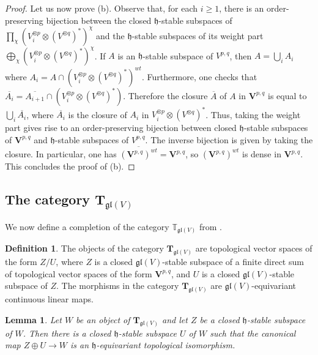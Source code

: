 \documentclass[12pt,reqno]{amsart}
\newtheorem{lem}[thm]{Lemma}
\theoremstyle{definition}
\newtheorem{defn}[thm]{Definition}
\theoremstyle{remark}
\begin{document}
\begin{proof}
	Let us now prove (b). Observe that, for each $i\geq 1$, there is an order-preserving bijection between the closed $\mathfrak{h}$-stable subspaces of $\prod_\chi (V_i ^{\otimes p}\otimes (V^{\otimes q})^*)^\chi$ and the $\mathfrak{h}$-stable subspaces of its weight part $\bigoplus_\chi (V_i ^{\otimes p}\otimes (V^{\otimes q})^*)^\chi$. If $A$ is an $\mathfrak{h}$-stable subspace of ${V}^{p,q}$, then $A = \bigcup_i A_i$ where $A_i = A \cap (V_i ^{\otimes p}\otimes (V^{\otimes q})^*)^{wt}$. 
	Furthermore, one checks that $\overline{A_i} = \overline{A_{i+1}}\cap (V_i ^{\otimes p}\otimes (V^{\otimes q})^*)$.
	Therefore the closure $\overline{A}$ of $A$ in $\mathbf{V}^{p,q}$ is equal to $\bigcup_i \overline{A_i}$, where $\overline{A_i}$ is the closure of $A_i$ in $V_i ^{\otimes p}\otimes (V^{\otimes q})^*$. Thus, taking the weight part gives rise to an order-preserving bijection between closed $\mathfrak{h}$-stable subspaces of $\mathbf{V}^{p,q}$ and $\mathfrak{h}$-stable subspaces of $V^{p,q}$. The inverse bijection is given by taking the closure. In particular, one has $\overline{(\mathbf{V}^{p,q})^{wt}}=\mathbf{V}^{p,q}$, so $(\mathbf{V}^{p,q})^{wt}$ is dense in $\mathbf{V}^{p,q}$. This concludes the proof of (b).
	\end{proof}

	
	
	
	
	
	
	
	
	\subsection{The category $\mathbf{T}_{\mathfrak{gl}(V)}$}
	We now define a completion of the category $\mathbb{T}_{\mathfrak{gl}(V)}$ from \cite{C}.
	
	
	
	
	\begin{defn}\label{def:tglv}
		The objects of the category $\mathbf{T}_{\mathfrak{gl}(V)}$ are topological vector spaces of the form $Z/U$, where $Z$ is a closed $\mathfrak{gl}(V)$-stable subspace of a finite direct sum of topological vector spaces of the form $\mathbf{V}^{p,q}$, and $U$ is a closed $\mathfrak{gl}(V)$-stable subspace of $Z$. The morphisms in the category $\mathbf{T}_{\mathfrak{gl}(V)}$ are $\mathfrak{gl}(V)$-equivariant continuous linear maps.
	\end{defn}
	
		\begin{lem}\label{T-split}
		Let $W$ be an object of $\mathbf{T}_{\mathfrak{gl}(V)}$ and let $Z$ be a closed $\mathfrak{h}$-stable subspace of $W$. Then there is a closed $\mathfrak{h}$-stable subspace $U$ of $W$ such that the canonical map $Z\oplus U \rightarrow W$ is an $\mathfrak{h}$-equivariant topological isomorphism. 
	\end{lem}
	
\end{document}
